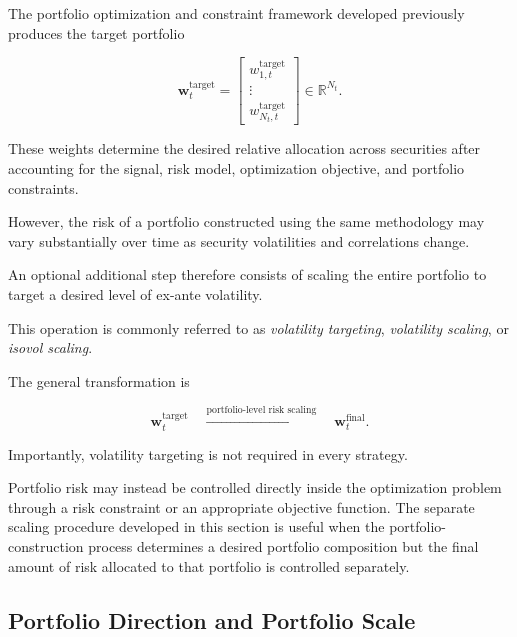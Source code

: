\documentclass[11pt,a4paper]{article}
\begin{document}
The portfolio optimization and constraint framework developed previously
produces the target portfolio

\begin{equation}
\boxed{
\mathbf{w}_t^{\mathrm{target}}
=
\begin{bmatrix}
w_{1,t}^{\mathrm{target}}
\\
\vdots
\\
w_{N_t,t}^{\mathrm{target}}
\end{bmatrix}
\in
\mathbb{R}^{N_t}.
}
\end{equation}

These weights determine the desired relative allocation across securities after
accounting for the signal, risk model, optimization objective, and portfolio
constraints.

However, the risk of a portfolio constructed using the same methodology may
vary substantially over time as security volatilities and correlations change.

An optional additional step therefore consists of scaling the entire portfolio
to target a desired level of ex-ante volatility.

This operation is commonly referred to as \emph{volatility targeting},
\emph{volatility scaling}, or \emph{isovol scaling}.

The general transformation is

\begin{equation}
\boxed{
\mathbf{w}_t^{\mathrm{target}}
\quad
\xrightarrow{\text{portfolio-level risk scaling}}
\quad
\mathbf{w}_t^{\mathrm{final}}.
}
\end{equation}

Importantly, volatility targeting is not required in every strategy.

Portfolio risk may instead be controlled directly inside the optimization
problem through a risk constraint or an appropriate objective function. The
separate scaling procedure developed in this section is useful when the
portfolio-construction process determines a desired portfolio composition but
the final amount of risk allocated to that portfolio is controlled separately.


\subsection{Portfolio Direction and Portfolio Scale}
\label{subsec:portfolio_direction_scale}
\end{document}

